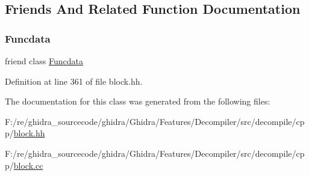 \subsection{Friends And Related Function Documentation}
\mbox{\label{class_block_basic_a16ade990887167c11c41cb88121bb449}} 
\subsubsection{\texorpdfstring{Funcdata}{Funcdata}}
{\footnotesize\ttfamily friend class \mbox{\hyperlink{class_funcdata}{Funcdata}}\hspace{0.3cm}{\ttfamily [friend]}}



Definition at line 361 of file block.\+hh.



The documentation for this class was generated from the following files\+:\begin{DoxyCompactItemize}
\item 
F\+:/re/ghidra\+\_\+sourcecode/ghidra/\+Ghidra/\+Features/\+Decompiler/src/decompile/cpp/\mbox{\hyperlink{block_8hh}{block.\+hh}}\item 
F\+:/re/ghidra\+\_\+sourcecode/ghidra/\+Ghidra/\+Features/\+Decompiler/src/decompile/cpp/\mbox{\hyperlink{block_8cc}{block.\+cc}}\end{DoxyCompactItemize}
